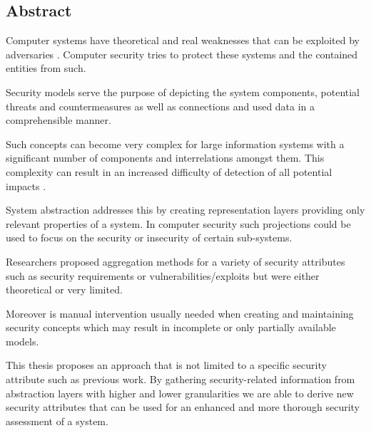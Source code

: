 \subsection*{Abstract}
\pagestyle{empty}

Computer systems have theoretical and real weaknesses that can be exploited by adversaries \cite{Pfleeger:2006:SC:1177321}. Computer security tries to protect these systems and the contained entities from such.

Security models serve the purpose of depicting the system components, potential threats and countermeasures as well as connections and used data in a comprehensible manner. 

Such concepts can become very complex for large information systems with a significant number of components and interrelations amongst them. This complexity can result in an increased difficulty of detection of all potential impacts \cite{branagan}.

System abstraction addresses this by creating representation layers providing only relevant properties of a system. In computer security such projections could be used to focus on the security or insecurity of certain sub-systems.

Researchers proposed aggregation methods for a variety of security attributes such as security requirements \cite{Menzel2008} or vulnerabilities/exploits \cite{Noel:2004:MAG:1029208.1029225} but were either theoretical or very limited. 

Moreover is manual intervention usually needed  when creating and maintaining security concepts  which may result in incomplete or only partially available models.

This thesis proposes an approach that is not limited to a specific security attribute such as previous work. By gathering security-related information from abstraction layers with higher and lower granularities we are able to derive new security attributes that can be used for an enhanced and more thorough security assessment of a system.
